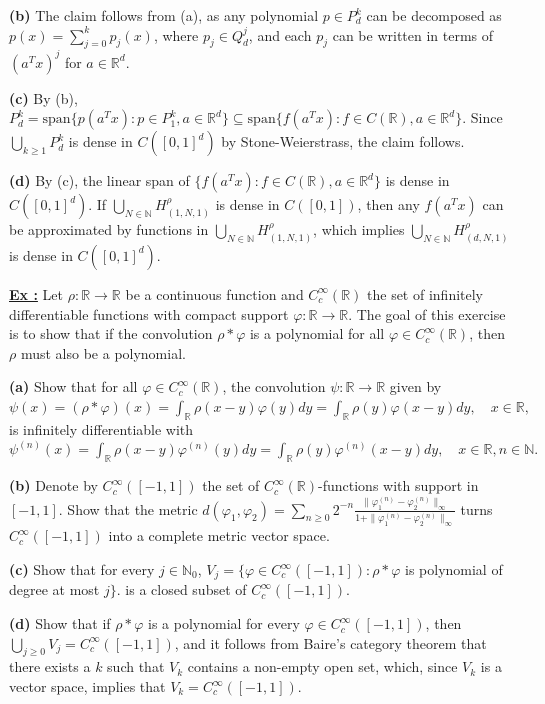 \documentclass[a4paper,10pt]{article}
\newcounter{exerciseCounter}
\newcommand{\exercise}[1]{%
    \vspace{1mm}
    \stepcounter{exerciseCounter}%
    \color{exerciseBlack}
    \textbf{\underline{Ex \theexerciseCounter:}} #1
}
\begin{document}
\begin{scriptsize}
{\textbf{(b)} The claim follows from (a), as any polynomial $p \in P^k_d$ can be decomposed as $p(x) = \sum_{j=0}^k p_j(x)$, where $p_j \in Q^j_d$, and each $p_j$ can be written in terms of $(a^T x)^j$ for $a \in \mathbb{R}^d$.

\textbf{(c)} By (b), $P^k_d = \text{span}\{p(a^T x): p \in P^k_1, a \in \mathbb{R}^d\} \subseteq \text{span}\{f(a^T x): f \in C(\mathbb{R}), a \in \mathbb{R}^d\}$. Since $\bigcup_{k \geq 1} P^k_d$ is dense in $C([0,1]^d)$ by Stone-Weierstrass, the claim follows.

\textbf{(d)} \color{solutionGray} By (c), the linear span of $\{f(a^T x): f \in C(\mathbb{R}), a \in \mathbb{R}^d\}$ is dense in $C([0,1]^d)$. If $\bigcup_{N \in \mathbb{N}} H^\rho_{(1,N,1)}$ is dense in $C([0,1])$, then any $f(a^T x)$ can be approximated by functions in $\bigcup_{N \in \mathbb{N}} H^\rho_{(1,N,1)}$, which implies $\bigcup_{N \in \mathbb{N}} H^\rho_{(d,N,1)}$ is dense in $C([0,1]^d)$.}


\exercise{Let $\rho: \mathbb{R} \to \mathbb{R}$ be a continuous function and $C_c^\infty(\mathbb{R})$ the set of infinitely differentiable functions with compact support $\varphi: \mathbb{R} \to \mathbb{R}$. The goal of this exercise is to show that if the convolution $\rho \ast \varphi$ is a polynomial for all $\varphi \in C_c^\infty(\mathbb{R})$, then $\rho$ must also be a polynomial.

\textbf{(a)} Show that for all $\varphi \in C_c^\infty(\mathbb{R})$, the convolution $\psi: \mathbb{R} \to \mathbb{R}$ given by
$
\psi(x) = (\rho \ast \varphi)(x) = \int_{\mathbb{R}} \rho(x-y)\varphi(y)dy = \int_{\mathbb{R}} \rho(y)\varphi(x-y)dy, \quad x \in \mathbb{R},
$
is infinitely differentiable with
$
\psi^{(n)}(x) = \int_{\mathbb{R}} \rho(x-y)\varphi^{(n)}(y)dy = \int_{\mathbb{R}} \rho(y)\varphi^{(n)}(x-y)dy, \quad x \in \mathbb{R}, n \in \mathbb{N}.
$

\textbf{(b)} Denote by $C_c^\infty([-1,1])$ the set of $C_c^\infty(\mathbb{R})$-functions with support in $[-1,1]$. Show that the metric
$
d(\varphi_1, \varphi_2) = \sum_{n \geq 0} 2^{-n} \frac{\|\varphi_1^{(n)} - \varphi_2^{(n)}\|_\infty}{1 + \|\varphi_1^{(n)} - \varphi_2^{(n)}\|_\infty}
$
turns $C_c^\infty([-1,1])$ into a complete metric vector space.

\textbf{(c)} Show that for every $j \in \mathbb{N}_0$,
$
V_j = \{\varphi \in C_c^\infty([-1,1]) : \rho \ast \varphi$ is polynomial of degree at most $ j\}.
$
is a closed subset of $C_c^\infty([-1,1])$.

\textbf{(d)} Show that if $\rho \ast \varphi$ is a polynomial for every $\varphi \in C_c^\infty([-1,1])$, then $\bigcup_{j \geq 0} V_j = C_c^\infty([-1,1])$, and it follows from Baire’s category theorem that there exists a $k$ such that $V_k$ contains a non-empty open set, which, since $V_k$ is a vector space, implies that $V_k = C_c^\infty([-1,1])$.

}
\end{scriptsize}
\end{document}
